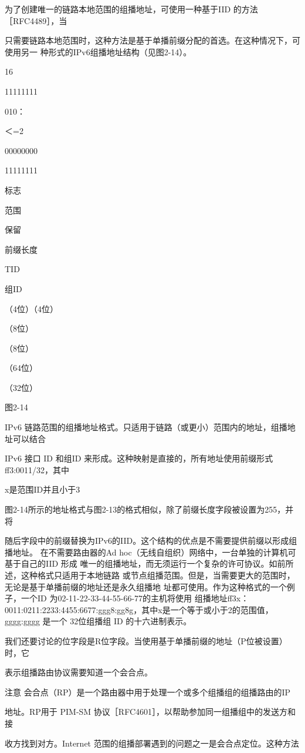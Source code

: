 为了创建唯一的链路本地范围的组播地址，可使用一种基于IID 的方法［RFC4489］，当

只需要链路本地范围时，这种方法是基于单播前缀分配的首选。在这种情况下，可使用另一
种形式的IPv6组播地址结构（见图2-14）。

16

11111111

010：

＜=2

00000000

11111111

标志

范围

保留

前缀长度

TID

组ID

（4位）（4位）

（8位）

（8位）

（64位）

（32位）

图2-14

IPv6 链路范围的组播地址格式。只适用于链路（或更小）范围内的地址，组播地址可以结合

IPv6 接口 ID 和组ID 来形成。这种映射是直接的，所有地址使用前缀形式ff3:0011/32，其中

x是范围ID并且小于3

图2-14所示的地址格式与图2-13的格式相似，除了前缀长度字段被设置为255，并将

随后字段中的前缀替换为IPv6的IID。这个结构的优点是不需要提供前缀以形成组播地址。
在不需要路由器的Ad hoc（无线自组织）网络中，一台单独的计算机可基于自己的IID 形成
唯一的组播地址，而无须运行一个复杂的许可协议。如前所述，这种格式只适用于本地链路
或节点组播范围。但是，当需要更大的范围时，无论是基于单播前缀的地址还是永久组播地
址都可使用。作为这种格式的一个例子，一个ID 为02-11-22-33-44-55-66-77的主机将使用
组播地址ff3x：0011:0211:2233:4455:6677:ggg8:gg8g，其中x是一个等于或小于2的范围值，
gggg:gggg 是一个 32位组播组 ID 的十六进制表示。

我们还要讨论的位字段是R位字段。当使用基于单播前缀的地址（P位被设置）时，它

表示组播路由协议需要知道一个会合点。

注意 会合点（RP）是一个路由器中用于处理一个或多个组播组的组播路由的IP

地址。RP用于 PIM-SM 协议［RFC4601］，以帮助参加同一组播组中的发送方和接

收方找到对方。Internet 范围的组播部署遇到的问题之一是会合点定位。这种方法

